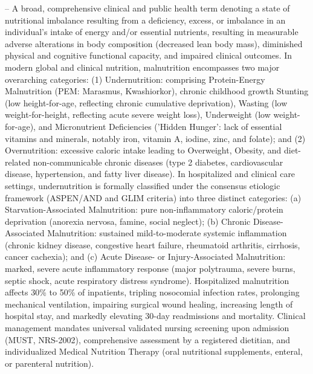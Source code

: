 -- A broad, comprehensive clinical and public health term denoting a state of nutritional imbalance resulting from a deficiency, excess, or imbalance in an individual's intake of energy and/or essential nutrients, resulting in measurable adverse alterations in body composition (decreased lean body mass), diminished physical and cognitive functional capacity, and impaired clinical outcomes. In modern global and clinical nutrition, malnutrition encompasses two major overarching categories: (1) Undernutrition: comprising Protein-Energy Malnutrition (PEM: Marasmus, Kwashiorkor), chronic childhood growth Stunting (low height-for-age, reflecting chronic cumulative deprivation), Wasting (low weight-for-height, reflecting acute severe weight loss), Underweight (low weight-for-age), and Micronutrient Deficiencies ('Hidden Hunger': lack of essential vitamins and minerals, notably iron, vitamin A, iodine, zinc, and folate); and (2) Overnutrition: excessive caloric intake leading to Overweight, Obesity, and diet-related non-communicable chronic diseases (type 2 diabetes, cardiovascular disease, hypertension, and fatty liver disease). In hospitalized and clinical care settings, undernutrition is formally classified under the consensus etiologic framework (ASPEN/AND and GLIM criteria) into three distinct categories: (a) Starvation-Associated Malnutrition: pure non-inflammatory caloric/protein deprivation (anorexia nervosa, famine, social neglect); (b) Chronic Disease-Associated Malnutrition: sustained mild-to-moderate systemic inflammation (chronic kidney disease, congestive heart failure, rheumatoid arthritis, cirrhosis, cancer cachexia); and (c) Acute Disease- or Injury-Associated Malnutrition: marked, severe acute inflammatory response (major polytrauma, severe burns, septic shock, acute respiratory distress syndrome). Hospitalized malnutrition affects 30\% to 50\% of inpatients, tripling nosocomial infection rates, prolonging mechanical ventilation, impairing surgical wound healing, increasing length of hospital stay, and markedly elevating 30-day readmissions and mortality. Clinical management mandates universal validated nursing screening upon admission (MUST, NRS-2002), comprehensive assessment by a registered dietitian, and individualized Medical Nutrition Therapy (oral nutritional supplements, enteral, or parenteral nutrition).

